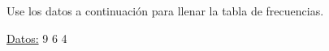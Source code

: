 \documentclass{cdplf-prueba}
\begin{document}
\subsection{}

Use los datos a continuación para llenar la tabla de frecuencias.

\underline{Datos:} \hspace{4pt} 9 \hspace{4pt}\textbullet\hspace{4pt} 6 \hspace{4pt}\textbullet\hspace{4pt} 4 \hspace{4pt}\textbullet\hspa
\end{document}
